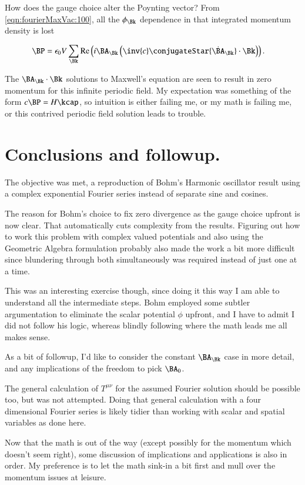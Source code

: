 How does the gauge choice alter the Poynting vector?  From \autoref{eqn:fourierMaxVac:100}, all the $\phi_\Bk$ dependence in that integrated momentum density is lost

\begin{align}\label{eqn:fourierMaxVac:200}
\BP &= \epsilon_0 V \sum_{\Bk}
\Real \left(
i \BA_\Bk \left( \inv{c} \conjugateStar{\dot{\BA}_\Bk} \cdot \Bk \right)
\right).
\end{align}

The $\BA_\Bk \cdot \Bk$ solutions to Maxwell's equation are seen to result in zero momentum for this infinite periodic field.  My expectation was something of the form $c \BP = H \kcap$, so intuition is either failing me, or my math is failing me, or this contrived periodic field solution leads to trouble.

\section{Conclusions and followup.}

The objective was met, a reproduction of Bohm's Harmonic oscillator result using a complex exponential Fourier series instead of separate sine and cosines.

The reason for Bohm's choice to fix zero divergence as the gauge choice upfront is now clear.  That automatically cuts complexity from the results.  Figuring out how to work this problem with complex valued potentials and also using the Geometric Algebra formulation probably also made the work a bit more difficult since blundering through both simultaneously was required instead of just one at a time.

This was an interesting exercise though, since doing it this way I am able to understand all the intermediate steps.  Bohm employed some subtler argumentation to eliminate the scalar potential $\phi$ upfront, and I have to admit I did not follow his logic, whereas blindly following where the math leads me all makes sense.

As a bit of followup, I'd like to consider the constant $\BA_\Bk$ case in more detail, and any implications of the freedom to pick $\BA_0$.

The general calculation of $T^{\mu\nu}$ for the assumed Fourier solution should be possible too, but was not attempted.  Doing that general calculation with a four dimensional Fourier series is likely tidier than working with scalar and spatial variables as done here.

Now that the math is out of the way (except possibly for the momentum which doesn't seem right), some discussion of implications and applications is also in order.  My preference is to let the math sink-in a bit first and mull over the momentum issues at leisure.

%

\EndArticle
